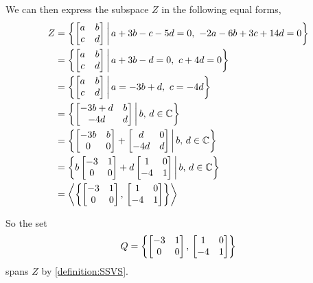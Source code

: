 \documentclass{ximera}
\begin{document}
\begin{example}
  We can then express the subspace $Z$ in the following equal forms,
  \begin{align*}
    Z&=\setparts{\begin{bmatrix}a&b\\c&d\end{bmatrix}}{a+3b-c-5d=0,\ -2a-6b+3c+14d=0}\\
     &=\setparts{\begin{bmatrix}a&b\\c&d\end{bmatrix}}{a+3b-d=0,\ c+4d=0}\\
     &=\setparts{\begin{bmatrix}a&b\\c&d\end{bmatrix}}{a=-3b+d,\ c=-4d}\\
     &=\setparts{\begin{bmatrix}-3b+d&b\\-4d&d\end{bmatrix}}{b,\,d\in\complexes}\\
     &=\setparts{
       \begin{bmatrix}-3b&b\\0&0\end{bmatrix}+
                                \begin{bmatrix}d&0\\-4d&d\end{bmatrix}
                                                         }{b,\,d\in\complexes}\\
     &=\setparts{
       b\begin{bmatrix}-3&1\\0&0\end{bmatrix}+
                                d\begin{bmatrix}1&0\\-4&1\end{bmatrix}
                                                         }{b,\,d\in\complexes}\\
     &=\spn{\set{
       \begin{bmatrix}-3&1\\0&0\end{bmatrix},\,
                               \begin{bmatrix}1&0\\-4&1\end{bmatrix}
                                                       }}
  \end{align*}

  So the set
  \[
    Q=\left\{
      \begin{bmatrix}-3&1\\0&0\end{bmatrix},\,
      \begin{bmatrix}1&0\\-4&1\end{bmatrix}
    \right\}
  \]
  spans $Z$ by \ref{definition:SSVS}.
\end{example}
\end{document}
